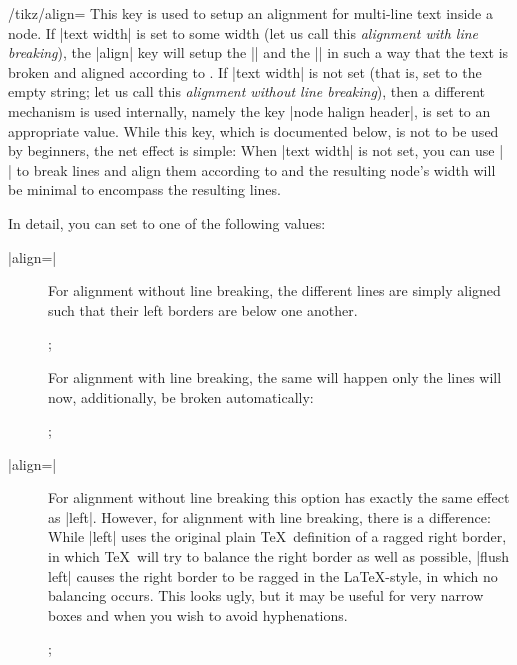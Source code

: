 \begin{key}{/tikz/align=}
  This key is used to setup an alignment for multi-line text inside a
  node. If |text width| is set to some width (let us call this
  \emph{alignment with line breaking}), the |align| key will
  setup the |\leftskip| and the |\rightskip| in such a way that the
  text is broken and aligned according to . If |text width|
  is not set (that is, set to the empty string; let us call this
  \emph{alignment without line breaking}), then a different
  mechanism is used internally, namely the key |node halign header|, is
  set to an appropriate value. While this key, which is documented
  below, is not to be used by beginners, the net effect is simple:
  When |text width| is not set, you can use |\\| to break lines and
  align them according to  and the resulting node's width
  will be minimal to encompass the resulting lines.

  In detail, you can set  to one of the following values:
  \begin{description}
  \item[|align=|]
    For alignment without line breaking, the different lines are simply
    aligned such that their left borders are below one another.
\begin{codeexample}[]
\tikz {};
\end{codeexample}
    For alignment with line breaking, the same will happen only
    the lines will now, additionally, be broken automatically:
\begin{codeexample}[]
\tikz {};
\end{codeexample}

  \item[|align=|]
    For alignment without line breaking this option has exactly the
    same effect as |left|. However, for alignment with line breaking,
    there is a difference: While |left| uses the
    original plain \TeX\ definition of a ragged right border, in which
    \TeX\ will try to balance the right border as well as possible,
    |flush left| causes the right border to be ragged in the
    \LaTeX-style, in which no balancing occurs. This looks ugly, but
    it may be useful for very narrow boxes and when you wish to avoid
    hyphenations.
\begin{codeexample}[]
\tikz {};
\end{codeexample}


\end{description}
\end{key}
